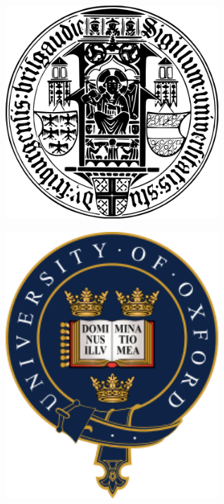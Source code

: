 \documentclass[landscape,a0b,final,a4resizeable]{include/a0poster}
\begin{document}
\begin{poster}
\begin{center}
\begin{pcolumn}{0.99}
{\begin{minipage}[c]{\logowidth}
    \includegraphics[width=8cm,trim=0em 0em 0em 0em, clip]{badges/freiburg}
\end{minipage}
%
\hspace{1cm}
% 
\begin{minipage}[c]{\logowidth}
    \includegraphics[width=8cm,trim=0em 0em 0em 0em, clip]{badges/oxford}
\end{minipage}

}
\end{pcolumn}
\end{center}

\vspace*{4cm}


\end{poster}
\end{document}
